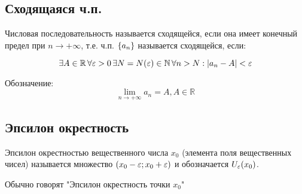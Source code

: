 \subsection{Сходящаяся ч.п.}

{
    Числовая последовательность называется сходящейся, если она имеет конечный предел при $ n \to +\infty $, т.е.
    ч.п. $ \{ a_n \} $ называется сходящейся, если:

    \[ \exists A \in \mathbb{R} \, \forall \varepsilon > 0 \, \exists N = N(\varepsilon) \in \mathbb{N} \, \forall n > N: | a_n - A | < \varepsilon \]

    Обозначение:
    \[ \lim_{n \to +\infty} a_n = A, A \in \mathbb{R} \]
}



\subsection{Эпсилон окрестность}

{
    Эпсилон окрестностью вещественного числа $ x_0 $ (элемента поля вещественных чисел)
    называется множество $ (x_0 - \varepsilon; x_0 + \varepsilon) $ и обозначается $ U_{\varepsilon}(x_0) $.

    Обычно говорят "Эпсилон окрестность точки $ x_0 $"
}

